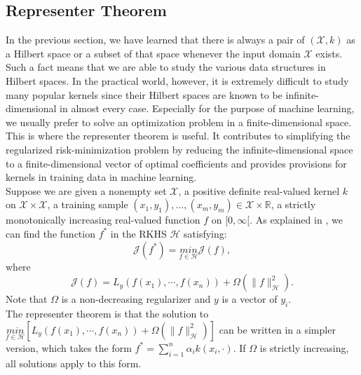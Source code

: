 \subsection{Representer Theorem}
In the previous section, we have learned that there is always a pair of $(\mathcal{X},k)$ as a Hilbert space or a subset of that space whenever the input domain $\mathcal{X}$ exists. Such a fact means that we are able to study the various data structures in Hilbert spaces. 
In the practical world, however, it is extremely difficult to study many popular kernels since their Hilbert spaces are known to be infinite-dimensional in almost every case. Especially for the purpose of machine learning, we usually prefer to solve an optimization problem in a finite-dimensional space. \\
This is where the representer theorem is useful. It contributes to simplifying the regularized risk-minimization problem by reducing the infinite-dimensional space to a finite-dimensional vector of optimal coefficients and provides provisions for kernels in training data in machine learning.\\
Suppose we are given a nonempty set $\mathcal{X}$, a positive definite real-valued kernel $k$ on $\mathcal{X}\times\mathcal{X}$, a training sample $(x_1,y_1),\dots,(x_m,y_m)\in\mathcal{X}\times\mathbb{R}$, a strictly monotonically increasing real-valued function $f$ on $[0,\infty[$.
As explained in \citet{scholkopf2001generalized}, we can find the function $f^{*}$ in the RKHS $\mathcal{H}$ satisfying:
\begin{equation*}
    \mathcal{J}(f^{*})=\underset{f\in\mathcal{H}}{min}\mathcal{J}(f),
\end{equation*}
where 
\begin{equation*}
    \mathcal{J}(f)=L_y(f(x_1),\cdots,f(x_n))+\Omega(\parallel f \parallel_\mathcal{H}^2).
\end{equation*}
Note that $\Omega$ is a non-decreasing regularizer and $y$ is a vector of $y_i$. \\
The representer theorem is that the solution to $\underset{f\in\mathcal{H}}{min}[L_y(f(x_1),\cdots,f(x_n))+\Omega(\parallel f \parallel_\mathcal{H}^2)]$ can 
be written in a simpler version, which takes the form $f^{*}=\sum_{i=1}^n\alpha_i k(x_i,\cdot)$. If $\Omega$ is strictly increasing, all solutions apply to this form. 


